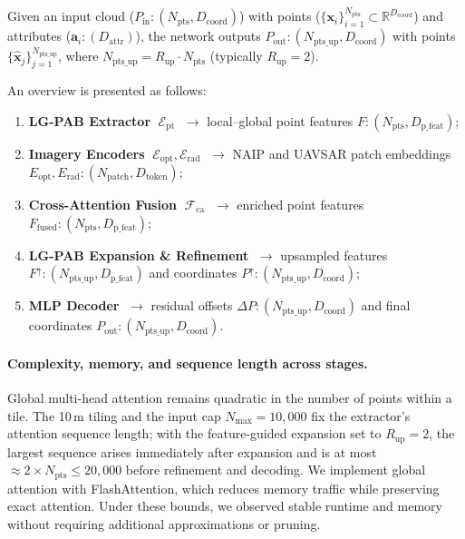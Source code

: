\documentclass[12pt]{report}
\begin{document}
Given an input cloud ($P_{\text{in}}: (N_{\text{pts}}, D_{\text{coord}})$) with points
 ($\{\mathbf{{x}}_i\}_{i=1}^{N_{\text{pts}}}\subset\mathbb{R}^{D_{\text{coord}}}$) and attributes ($\mathbf{a}_i: (D_{\text{attr}})$), the network outputs $P_{\text{out}}: (N_{\text{pts\_up}}, D_{\text{coord}})$ with points $\{\hat{\mathbf{x}}_j\}_{j=1}^{N_{\text{pts\_up}}}$, where $N_{\text{pts\_up}} = R_{\text{up}} \cdot N_{\text{pts}}$ (typically $R_{\text{up}} = 2$).

An overview is presented as follows:

\begin{enumerate}[leftmargin=*]
\item \textbf{LG-PAB Extractor
} $\;\mathcal{E}_{\mathrm{pt}}$
      $\;\rightarrow$ local–global point features $F: (N_{\text{pts}}, D_{\text{p\_feat}})$;
\item \textbf{Imagery Encoders} $\;\mathcal{E}_{\mathrm{opt}},\mathcal{E}_{\mathrm{rad}}$
      $\;\rightarrow$ NAIP and UAVSAR patch embeddings $E_{\text{opt}}, E_{\text{rad}}: (N_{\text{patch}}, D_{\text{token}})$;
\item \textbf{Cross-Attention Fusion} $\;\mathcal{F}_{\mathrm{ca}}$
      $\;\rightarrow$ enriched point features $F_{\!\mathrm{fused}}: (N_{\text{pts}}, D_{\text{p\_feat}})$;
\item \textbf{LG-PAB Expansion \& Refinement}
      $\;\rightarrow$ upsampled features $F^{\uparrow}: (N_{\text{pts\_up}}, D_{\text{p\_feat}})$ and coordinates $P^{\uparrow}: (N_{\text{pts\_up}}, D_{\text{coord}})$;
\item \textbf{MLP Decoder} $\;\rightarrow$ residual offsets $\Delta P: (N_{\text{pts\_up}}, D_{\text{coord}})$ and final coordinates $P_{\mathrm{out}}: (N_{\text{pts\_up}}, D_{\text{coord}})$.
\end{enumerate}


\paragraph{Complexity, memory, and sequence length across stages.}
Global multi-head attention remains quadratic in the number of points within a tile. The 10\,m tiling and the input cap $N_{\max}=10{,}000$ fix the extractor’s attention sequence length; with the feature-guided expansion set to $R_{\text{up}}=2$, the largest sequence arises immediately after expansion and is at most $\approx 2\times N_{\text{pts}} \le 20{,}000$ before refinement and decoding. We implement global attention with FlashAttention, which reduces memory traffic while preserving exact attention. Under these bounds, we observed stable runtime and memory without requiring additional approximations or pruning.
\end{document}
